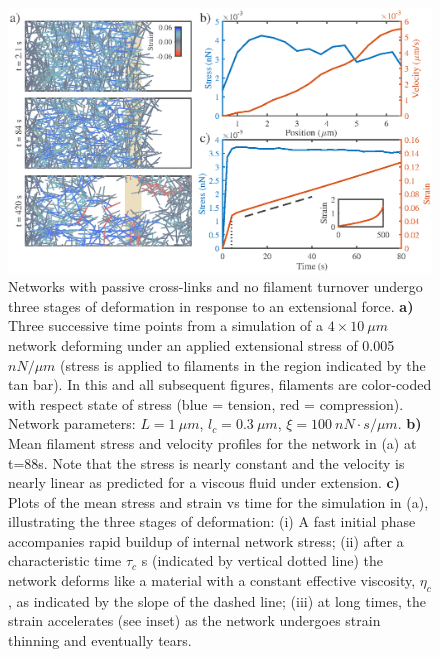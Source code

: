 \documentclass[10pt,letterpaper]{article}
\begin{document}
\begin{figure}[h!]
\centering
\includegraphics[width=\hsize]{figures/figure3a}
\caption{\label{fig:passive_ex}  Networks with passive cross-links and no filament turnover undergo three stages of deformation in response to an extensional force.   \textbf{a)} Three successive time points from a simulation of a $4\times10\: \mu m$ network deforming under an applied extensional stress of 0.005 $nN/\mu m$ (stress is applied to filaments in the region indicated by the tan bar). In this and all subsequent figures, filaments are color-coded with respect state of stress (blue = tension, red = compression).  Network parameters: $L=1\: \mu m$, $l_c=0.3\: \mu m$, $\xi=100\: nN\cdot s/\mu m$. \textbf{b)} Mean filament stress and velocity profiles for the  network in (a) at t=88s. Note that the stress is nearly constant and the velocity is nearly linear as predicted for a viscous fluid under extension.  \textbf{c)} Plots of the mean stress and strain vs time for the simulation in (a), illustrating the three stages of deformation: (i) A fast initial phase accompanies rapid buildup of internal network stress; (ii) after a characteristic time $\tau_c$ s (indicated by vertical dotted line) the network deforms like a material with a constant effective viscosity, $\eta_c$, as indicated by the slope of the dashed line; (iii) at long times, the strain accelerates (see inset) as the network undergoes strain thinning and eventually tears. }
\end{figure}

\end{document}
